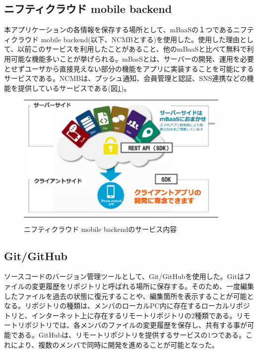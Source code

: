 \subsection{ニフティクラウド mobile backend}%
本アプリケーションの各情報を保存する場所として、mBaaSの１つであるニフティクラウド mobile backend(以下、NCMBとする)を使用した。使用した理由として、以前このサービスを利用したことがあること、他のmBaaSと比べて無料で利用可能な機能多いことが挙げられる。mBasSとは、サーバーの開発、運用を必要とせずユーザから直接見えない部分の機能をアプリに実装することを可能にするサービスである\cite{about_mbaas}。NCMBは、プッシュ通知、会員管理と認証、SNS連携などの機能\cite{price_mbaas}を提供しているサービスである(図\ref{fig:image_mbaas})。

\begin{figure}[htbp]
  \begin{center}
    \begin{tabular}{c}

      \begin{minipage}{0.7\hsize}
        \begin{center}
\includegraphics[width=10cm]{ncmb_overview.eps}
          \hspace{1cm} %
        \end{center}
      \end{minipage}

    \end{tabular}
    \caption{ニフティクラウド mobile backendのサービス内容\cite{intro_mbaas}}
    \label{fig:image_mbaas}
  \end{center}
\end{figure}


\subsection{Git/GitHub}%
ソースコードのバージョン管理ツールとして、Git/GitHubを使用した。Gitはファイルの変更履歴をリポジトリと呼ばれる場所に保存する。そのため、一度編集したファイルを過去の状態に復元することや、編集箇所を表示することが可能となる\cite{book_about_github}。リポジトリの種類は、メンバのローカルPC内に存在するローカルリポジトリと、インターネット上に存在するリモートリポジトリの2種類である\cite{monkey_git}。リモートリポジトリでは、各メンバのファイルの変更履歴を保存し、共有する事が可能である。GitHubは、リモートリポジトリを提供するサービスの1つである。これにより、複数のメンバで同時に開発を進めることが可能となった。


